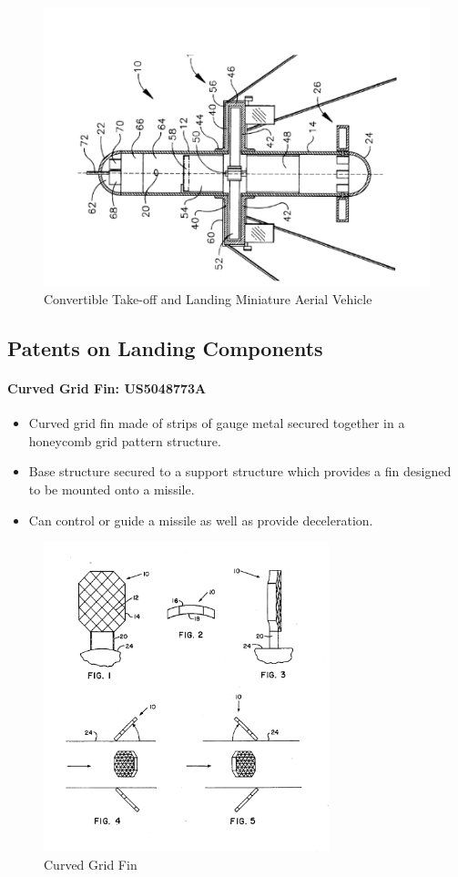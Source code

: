 \begin{figure}[H]
    \centering
    \includegraphics{src/figs/Patent2.png}
    \caption{Convertible Take-off and Landing Miniature Aerial Vehicle}
    \label{fig:P2}
\end{figure}

\subsection{Patents on Landing Components}

\paragraph{Curved Grid Fin: US5048773A}
\begin{itemize}
    \item Curved grid fin made of strips of gauge metal secured together in a honeycomb grid pattern structure.
    \item Base structure secured to a support structure which provides a fin designed to be mounted onto a missile.
    \item Can control or guide a missile as well as provide deceleration.
\end{itemize}

\begin{figure}[H]
    \centering
    \includegraphics{src/figs/Patent3.png}
    \caption{Curved Grid Fin}
    \label{fig:P3}
\end{figure}

